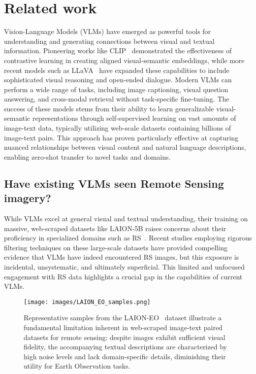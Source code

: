 \section{Related work}
Vision-Language Models (VLMs) have emerged as powerful tools for understanding and generating connections between visual and textual information. Pioneering works like CLIP~\cite{radford2021learning} demonstrated the effectiveness of contrastive learning in creating aligned visual-semantic embeddings, while more recent models such as LLaVA~\cite{liu2024visual,liu2024improved} have expanded these capabilities to include sophisticated visual reasoning and open-ended dialogue. Modern VLMs can perform a wide range of tasks, including image captioning, visual question answering, and cross-modal retrieval without task-specific fine-tuning. The success of these models stems from their ability to learn generalizable visual-semantic representations through self-supervised learning on vast amounts of image-text data, typically utilizing web-scale datasets containing billions of image-text pairs. This approach has proven particularly effective at capturing nuanced relationships between visual content and natural language descriptions, enabling zero-shot transfer to novel tasks and domains.

\subsection{Have existing VLMs seen Remote Sensing imagery?} \label{sec:seen_rs}
While VLMs excel at general visual and textual understanding, their training on massive, web-scraped datasets like LAION-5B raises concerns about their proficiency in specialized domains such as RS~\cite{panigrahi2023have}. Recent studies employing rigorous filtering techniques on these large-scale datasets have provided compelling evidence that VLMs have indeed encountered RS images, but this exposure is incidental, unsystematic, and ultimately superficial. This limited and unfocused engagement with RS data highlights a crucial gap in the capabilities of current VLMs.

\begin{figure*}
\centering
\texttt{[image: images/LAION\_EO\_samples.png]}
\caption{Representative samples from the LAION-EO~\cite{czerkawski2023laion} dataset illustrate a fundamental limitation inherent in web-scraped image-text paired datasets for remote sensing: despite images exhibit sufficient visual fidelity, the accompanying textual descriptions are characterized by high noise levels and lack domain-specific details, diminishing their utility for Earth Observation tasks.}
\label{fig:laion_samples}
\end{figure*}

